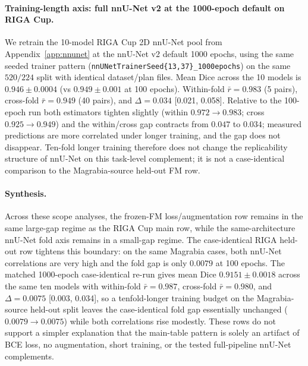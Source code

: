 \paragraph{Training-length axis: full nnU-Net v2 at the 1000-epoch default on RIGA Cup.}
We retrain the 10-model RIGA Cup 2D nnU-Net pool from Appendix~\ref{app:nnunet} at the nnU-Net v2 default 1000 epochs, using the same seeded trainer pattern (\texttt{nnUNetTrainerSeed\{13,37\}\_1000epochs}) on the same $520/224$ split with identical dataset/plan files. Mean Dice across the 10 models is $0.946 \pm 0.0004$ (vs $0.949 \pm 0.001$ at 100 epochs). Within-fold $\bar r{=}0.983$ (5 pairs), cross-fold $\bar r{=}0.949$ (40 pairs), and $\Delta{=}0.034$ [0.021, 0.058]. Relative to the 100-epoch run both estimators tighten slightly (within $0.972{\to}0.983$; cross $0.925{\to}0.949$) and the within/cross gap contracts from $0.047$ to $0.034$; measured predictions are more correlated under longer training, and the gap does not disappear. Ten-fold longer training therefore does not change the replicability structure of nnU-Net on this task-level complement; it is not a case-identical comparison to the Magrabia-source held-out FM row.

\paragraph{Synthesis.}
Across these scope analyses, the frozen-FM loss/augmentation row remains in the same large-gap regime as the RIGA Cup main row, while the same-architecture nnU-Net fold axis remains in a small-gap regime. The case-identical RIGA held-out row tightens this boundary: on the same Magrabia cases, both nnU-Net correlations are very high and the fold gap is only $0.0079$ at 100 epochs. The matched 1000-epoch case-identical re-run gives mean Dice $0.9151 \pm 0.0018$ across the same ten models with within-fold $\bar r{=}0.987$, cross-fold $\bar r{=}0.980$, and $\Delta{=}0.0075$ [0.003, 0.034], so a tenfold-longer training budget on the Magrabia-source held-out split leaves the case-identical fold gap essentially unchanged ($0.0079{\to}0.0075$) while both correlations rise modestly. These rows do not support a simpler explanation that the main-table pattern is solely an artifact of BCE loss, no augmentation, short training, or the tested full-pipeline nnU-Net complements.

